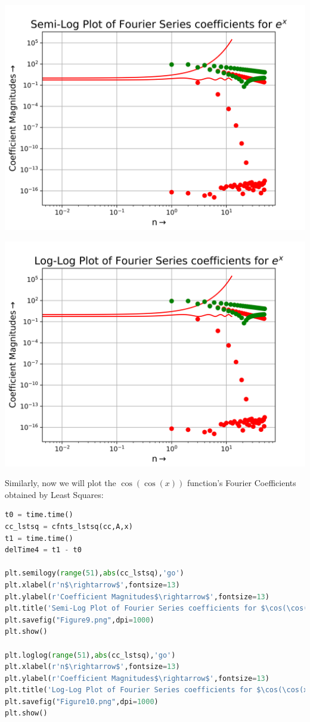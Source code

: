 \documentclass[12pt]{article}
\begin{document}
\begin{center}
    \includegraphics[scale=0.8]{images/Figure7.png}
\end{center}
\begin{center}
    \includegraphics[scale=0.8]{images/Figure8.png}
\end{center}
\pagebreak

Similarly, now we will plot the $\cos(\cos(x))$ function's Fourier Coefficients obtained by Least Squares:

\begin{lstlisting}[language=Python]
t0 = time.time()
cc_lstsq = cfnts_lstsq(cc,A,x)
t1 = time.time()
delTime4 = t1 - t0

plt.semilogy(range(51),abs(cc_lstsq),'go')
plt.xlabel(r'n$\rightarrow$',fontsize=13)
plt.ylabel(r'Coefficient Magnitudes$\rightarrow$',fontsize=13)
plt.title('Semi-Log Plot of Fourier Series coefficients for $\cos(\cos(x))$',fontsize=16)
plt.savefig("Figure9.png",dpi=1000)
plt.show()

plt.loglog(range(51),abs(cc_lstsq),'go')
plt.xlabel(r'n$\rightarrow$',fontsize=13)
plt.ylabel(r'Coefficient Magnitudes$\rightarrow$',fontsize=13)
plt.title('Log-Log Plot of Fourier Series coefficients for $\cos(\cos(x))$',fontsize=16)
plt.savefig("Figure10.png",dpi=1000)
plt.show()
\end{lstlisting}
\end{document}
